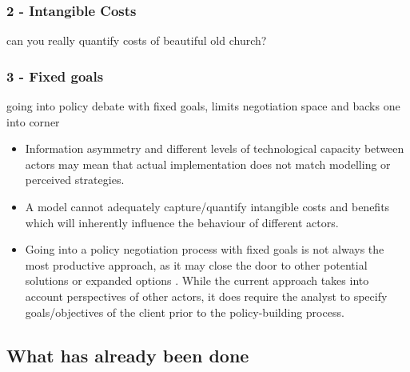 \subsubsection{2 - Intangible Costs}
can you really quantify costs of beautiful old church?
\subsubsection{3 - Fixed goals}
going into policy debate with fixed goals, limits negotiation space and backs one into corner

\begin{itemize}
    \item Information asymmetry and different levels of technological capacity between actors may mean that actual implementation does not match modelling or perceived strategies.
    \item A model cannot adequately capture/quantify intangible costs and benefits which will inherently influence the behaviour of different actors.
    \item Going into a policy negotiation process with fixed goals is not always the most productive approach, as it may close the door to other potential solutions or expanded options \parencite{de_bruijn_management_2018}. While the current approach takes into account perspectives of other actors, it does require the analyst to specify goals/objectives of the client prior to the policy-building process.
     
\end{itemize}

\subsection{What has already been done}

